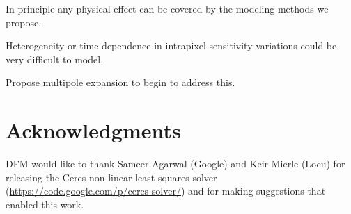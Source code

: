 \documentclass[12pt]{article}
\begin{document}
In principle any physical effect can be covered by the modeling
methods we propose.

Heterogeneity or time dependence in intrapixel sensitivity variations
could be very difficult to model.

Propose multipole expansion to begin to address this.

\section{Acknowledgments}

DFM would like to thank Sameer Agarwal (Google) and Keir Mierle (Locu) for
releasing the Ceres non-linear least squares solver
(\url{https://code.google.com/p/ceres-solver/}) and for making suggestions
that enabled this work.
\end{document}
